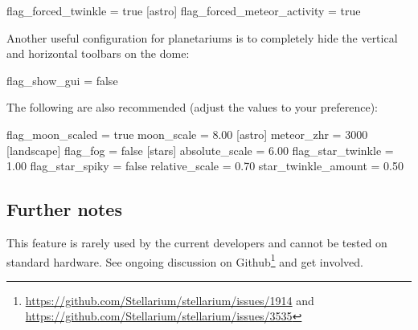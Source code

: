 \begin{configfile}
[stars]
flag_forced_twinkle = true
[astro]
flag_forced_meteor_activity = true
\end{configfile}

Another useful configuration for planetariums is to completely hide the vertical and horizontal toolbars on the
dome:
\begin{configfile}
[gui]
flag_show_gui = false
\end{configfile}

The following are also recommended (adjust the values to your preference):
\begin{configfile}
[viewing]
flag_moon_scaled = true
moon_scale = 8.00
[astro]
meteor_zhr = 3000
[landscape]
flag_fog = false
[stars]
absolute_scale = 6.00
flag_star_twinkle = 1.00
flag_star_spiky = false
relative_scale = 0.70
star_twinkle_amount = 0.50
\end{configfile}


\subsection{Further notes}
This feature is rarely used by the current developers and cannot be tested on standard hardware. 
See ongoing discussion on Github\footnote{\url{https://github.com/Stellarium/stellarium/issues/1914} and \\
\url{https://github.com/Stellarium/stellarium/issues/3535}} and get involved.




